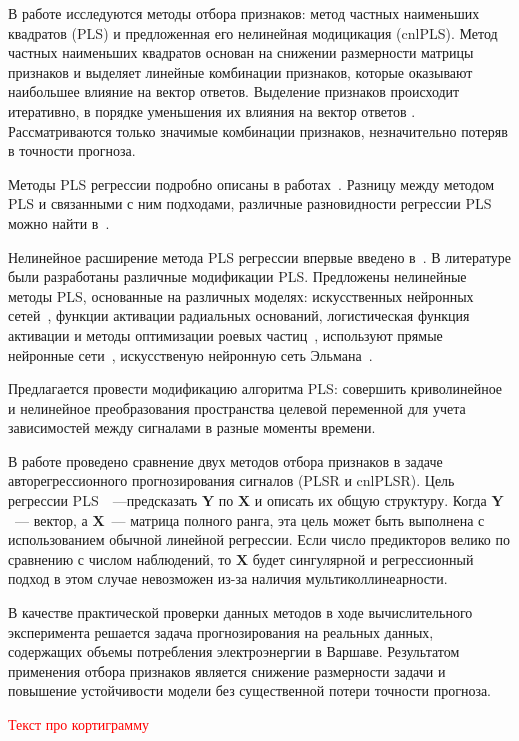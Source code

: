 \documentclass[12pt,twoside]{article}
\newcommand{\bY}{\mathbf{Y}}
\newcommand{\bX}{\mathbf{X}}
\begin{document}
В работе исследуются методы отбора признаков: метод частных наименьших квадратов (PLS) \cite{Ng2013} и предложенная его нелинейная модицикация (cnlPLS).
Метод частных наименьших квадратов основан на снижении размерности матрицы признаков и выделяет линейные комбинации признаков, которые оказывают наибольшее влияние на вектор ответов. 
Выделение признаков происходит итеративно, в порядке уменьшения их влияния на вектор ответов \cite{Ng2013}. Рассматриваются только значимые комбинации признаков, незначительно потеряв в точности прогноза. 

Методы PLS регрессии подробно описаны в работах~\cite{Geladi1988, Hoskuldsson1988}. 
Разницу между методом PLS и связанными с ним подходами, различные разновидности регрессии PLS можно найти в~\cite{Lehky2014}.

Нелинейное расширение метода PLS регрессии впервые введено в~\cite{Frank1990}. 
В литературе были разработаны различные модификации PLS. 
Предложены нелинейные методы PLS, основанные на различных моделях:  искусственных нейронных сетей~\cite{Mcavovt1992}, функции активации радиальных оснований\cite{Yan2003}, логистическая функция активации и методы оптимизации роевых частиц~\cite{Zhou2007}, используют прямые нейронные сети~\cite{Xuefeng2010}, искусственую нейронную сеть Эльмана~\cite{Bulut2014}.

Предлагается провести модификацию алгоритма PLS: совершить криволинейное и нелинейное преобразования пространства целевой переменной для учета зависимостей между сигналами в разные моменты времени.


В работе проведено сравнение двух методов отбора признаков в задаче авторегрессионного прогнозирования сигналов (PLSR и cnlPLSR). 
Цель регрессии PLS~\cite{Abdi2003}~---предсказать $\bY$ по $\bX$ и описать их общую структуру. 
Когда $\bY$~--- вектор, а $\bX$~--- матрица полного ранга, эта цель может быть выполнена с использованием обычной линейной регрессии. 
Если число предикторов велико по сравнению с числом наблюдений, то $\bX$ будет сингулярной и регрессионный подход в этом случае невозможен из-за наличия мультиколлинеарности.

В качестве практической проверки данных методов в ходе вычислительного эксперимента решается задача прогнозирования на реальных данных, содержащих объемы потребления электроэнергии в Варшаве.
Результатом применения отбора признаков является снижение размерности задачи и повышение устойчивости модели без существенной потери точности прогноза.

\textcolor{red}{ Текст про кортиграмму}
 
\end{document}
